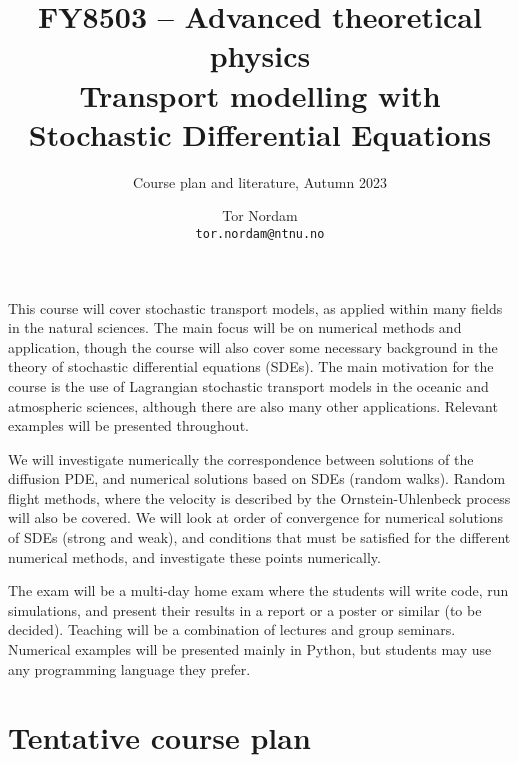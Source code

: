 \documentclass{article}
\title{FY8503 -- Advanced theoretical physics\\[5pt]
\large Transport modelling with Stochastic Differential Equations}
\author{Course plan and literature, Autumn 2023}
\date{Tor Nordam\\\texttt{tor.nordam@ntnu.no}}
\begin{document}
\maketitle


This course will cover stochastic transport models, as applied within many fields in the natural sciences. The main focus will be on numerical methods and application, though the course will also cover some necessary background in the theory of stochastic differential equations (SDEs). The main motivation for the course is the use of Lagrangian stochastic transport models in the oceanic and atmospheric sciences, although there are also many other applications. Relevant examples will be presented throughout.

We will investigate numerically the correspondence between solutions of the diffusion PDE, and numerical solutions based on SDEs (random walks). Random flight methods, where the velocity is described by the Ornstein-Uhlenbeck process will also be covered. We will look at order of convergence for numerical solutions of SDEs (strong and weak), and conditions that must be satisfied for the different numerical methods, and investigate these points numerically.

The exam will be a multi-day home exam where the students will write code, run simulations, and present their results in a report or a poster or similar (to be decided). Teaching will be a combination of lectures and group seminars. Numerical examples will be presented mainly in Python, but students may use any programming language they prefer.

\section{Tentative course plan}
\end{document}
